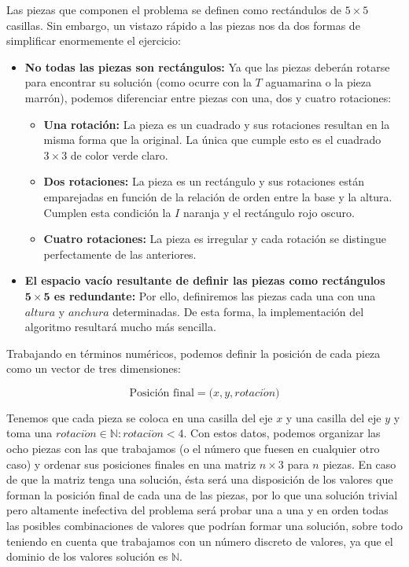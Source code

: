 Las piezas que componen el problema se definen como rectándulos de $5\times5$ casillas.
Sin embargo, un vistazo rápido a las piezas nos da dos formas de simplificar enormemente el ejercicio:

\begin{itemize}
	\item\textbf{No todas las piezas son rectángulos:} Ya que las piezas deberán rotarse para encontrar su solución (como ocurre con la $T$ aguamarina o la pieza marrón), podemos diferenciar entre piezas con una, dos y cuatro rotaciones:
	\begin{itemize}
		\item\textbf{Una rotación:} La pieza es un cuadrado y sus rotaciones resultan en la misma forma que la original. La única que cumple esto es el cuadrado $3\times3$ de color verde claro.
		\item\textbf{Dos rotaciones:} La pieza es un rectángulo y sus rotaciones están emparejadas en función de la relación de orden entre la base y la altura. Cumplen esta condición la $I$ naranja y el rectángulo rojo oscuro.
		\item\textbf{Cuatro rotaciones:} La pieza es irregular y cada rotación se distingue perfectamente de las anteriores.
	\end{itemize}
	\item\textbf{El espacio vacío resultante de definir las piezas como rectángulos $\boldsymbol{5\times5}$ es redundante:} Por ello, definiremos las piezas cada una con una $altura$ y $anchura$ determinadas. De esta forma, la implementación del algoritmo resultará mucho más sencilla.
\end{itemize}

Trabajando en términos numéricos, podemos definir la posición de cada pieza como un vector de tres dimensiones:

\[\text{Posición final} = \big(x,y,rotaci\acute{o}n\big)\]

Tenemos que cada pieza se coloca en una casilla del eje $x$ y una casilla del eje $y$ y toma una $rotaci\acute{o}n\in\mathbb{N}:rotaci\acute{o}n<4$.
Con estos datos, podemos organizar las ocho piezas con las que trabajamos (o el número que fuesen en cualquier otro caso) y ordenar sus posiciones finales en una matriz $n\times3$ para $n$ piezas.
En caso de que la matriz tenga una solución, ésta será una disposición de los valores que forman la posición final de cada una de las piezas, por lo que una solución trivial pero altamente inefectiva del problema será probar una a una y en orden todas las posibles combinaciones de valores que podrían formar una solución, sobre todo teniendo en cuenta que trabajamos con un número discreto de valores, ya que el dominio de los valores solución es $\mathbb{N}$.

